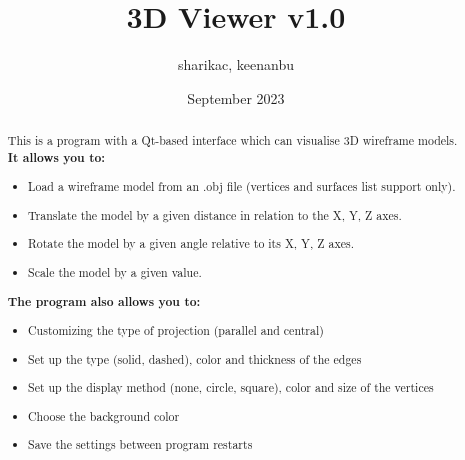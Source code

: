 \documentclass[a4paper, 12pt]{article}
\title{3D Viewer v1.0}
\author{sharikac, keenanbu}
\date{September 2023}
\begin{document}
\maketitle
\newpage
\begin{abstract}
\large This is a program with a Qt-based interface which can visualise 3D wireframe models.
\newpage
{\bf \large It allows you to:}
\begin{itemize}
\item \parskip 3mm Load a wireframe model from an .obj file (vertices and surfaces list support only).
\item Translate the model by a given distance in relation to the X, Y, Z axes.
\item Rotate the model by a given angle relative to its X, Y, Z axes.
\item Scale the model by a given value.
\end{itemize}

{\bf \large \parskip 10mm The program also allows you to:}
\begin{itemize}
\item \parskip 3mm Customizing the type of projection (parallel and central)
\item Set up the type (solid, dashed), color and thickness of the edges
\item Set up the display method (none, circle, square), color and size of the vertices
\item Choose the background color
\item Save the settings between program restarts
\end{itemize}


\end{abstract}
\end{document}
